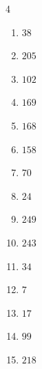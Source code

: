 \begin{multicols}{4}
\begin{enumerate}
  \item $38$


  \item $205$


  \item $102$


  \item $169$


  \item $168$


  \item $158$


  \item $70$


  \item $24$


  \item $249$


  \item $243$


  \item $34$


  \item $7$


\columnbreak %

\resetques

  \item $17$


  \item $99$


  \item $218$



\end{enumerate}
\end{multicols}
